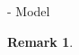 \documentclass[journal]{IEEEtran}
\newtheorem{remark}{Remark}
\begin{document}
\begin{section}{- Model}
\begin{remark}
\begin{itemize}
		\end{itemize}
	\end{remark}







\end{section}
\end{document}
